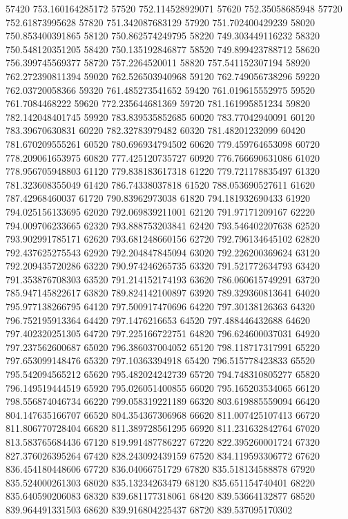 {57420 753.160164285172
57520 752.114528929071
57620 752.35058685948
57720 752.61873995628
57820 751.342087683129
57920 751.702400429239
58020 750.853400391865
58120 750.862574249795
58220 749.303449116232
58320 750.548120351205
58420 750.135192846877
58520 749.899423788712
58620 756.399745569377
58720 757.2264520011
58820 757.541152307194
58920 762.272390811394
59020 762.526503940968
59120 762.749056738296
59220 762.03720058366
59320 761.485273541652
59420 761.019615552975
59520 761.7084468222
59620 772.235644681369
59720 781.161995851234
59820 782.142048401745
59920 783.839535852685
60020 783.77042940091
60120 783.39670630831
60220 782.32783979482
60320 781.48201232099
60420 781.670209555261
60520 780.696934794502
60620 779.459764653098
60720 778.209061653975
60820 777.425120735727
60920 776.766690631086
61020 778.956705948803
61120 779.838183617318
61220 779.721178835497
61320 781.323608355049
61420 786.74338037818
61520 788.053690527611
61620 787.42968460037
61720 790.83962973038
61820 794.181932690433
61920 794.025156133695
62020 792.069839211001
62120 791.97171209167
62220 794.009706233665
62320 793.888753203841
62420 793.546402207638
62520 793.902991785171
62620 793.681248660156
62720 792.796134645102
62820 792.437625275543
62920 792.204847845094
63020 792.226200369624
63120 792.209435720286
63220 790.974246265735
63320 791.521772634793
63420 791.353876708303
63520 791.214152174193
63620 786.060615749291
63720 785.947145822617
63820 789.824142100897
63920 789.329360813641
64020 795.977138266795
64120 797.500917470696
64220 797.30138126363
64320 796.752195913364
64420 797.1476216653
64520 797.488446432688
64620 797.402320251305
64720 797.225166722751
64820 796.624600037031
64920 797.237562600687
65020 796.386037004052
65120 798.118717317991
65220 797.653099148476
65320 797.10363394918
65420 796.515778423833
65520 795.542094565212
65620 795.482024242739
65720 794.748310805277
65820 796.149519444519
65920 795.026051400855
66020 795.165203534065
66120 798.556874046734
66220 799.058319221189
66320 803.619885559094
66420 804.147635166707
66520 804.354367306968
66620 811.007425107413
66720 811.806770728404
66820 811.389728561295
66920 811.231632842764
67020 813.583765684436
67120 819.991487786227
67220 822.395260001724
67320 827.376026395264
67420 828.243092439159
67520 834.119593306772
67620 836.454180448606
67720 836.04066751729
67820 835.518134588878
67920 835.524000261303
68020 835.13234263479
68120 835.651154740401
68220 835.640590206083
68320 839.681177318061
68420 839.53664132877
68520 839.964491331503
68620 839.916804225437
68720 839.537095170302
}
